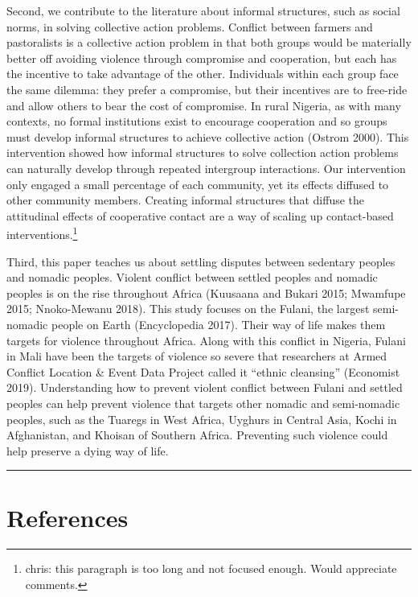 \documentclass[11pt]{article}
\begin{document}
Second, we contribute to the literature about informal structures, such
as social norms, in solving collective action problems. Conflict between
farmers and pastoralists is a collective action problem in that both
groups would be materially better off avoiding violence through
compromise and cooperation, but each has the incentive to take advantage
of the other. Individuals within each group face the same dilemma: they
prefer a compromise, but their incentives are to free-ride and allow
others to bear the cost of compromise. In rural Nigeria, as with many
contexts, no formal institutions exist to encourage cooperation and so
groups must develop informal structures to achieve collective action
(Ostrom 2000). This intervention showed how informal structures to solve
collection action problems can naturally develop through repeated
intergroup interactions. Our intervention only engaged a small
percentage of each community, yet its effects diffused to other
community members. Creating informal structures that diffuse the
attitudinal effects of cooperative contact are a way of scaling up
contact-based interventions.\footnote{chris: this paragraph is too long
  and not focused enough. Would appreciate comments.}

Third, this paper teaches us about settling disputes between sedentary
peoples and nomadic peoples. Violent conflict between settled peoples
and nomadic peoples is on the rise throughout Africa (Kuusaana and
Bukari 2015; Mwamfupe 2015; Nnoko-Mewanu 2018). This study focuses on
the Fulani, the largest semi-nomadic people on Earth (Encyclopedia
2017). Their way of life makes them targets for violence throughout
Africa. Along with this conflict in Nigeria, Fulani in Mali have been
the targets of violence so severe that researchers at Armed Conflict
Location \& Event Data Project called it ``ethnic cleansing'' (Economist
2019). Understanding how to prevent violent conflict between Fulani and
settled peoples can help prevent violence that targets other nomadic and
semi-nomadic peoples, such as the Tuaregs in West Africa, Uyghurs in
Central Asia, Kochi in Afghanistan, and Khoisan of Southern Africa.
Preventing such violence could help preserve a dying way of life.

\begin{center}\rule{0.5\linewidth}{\linethickness}\end{center}

\hypertarget{references}{%
\section*{References}\label{references}}
\end{document}
